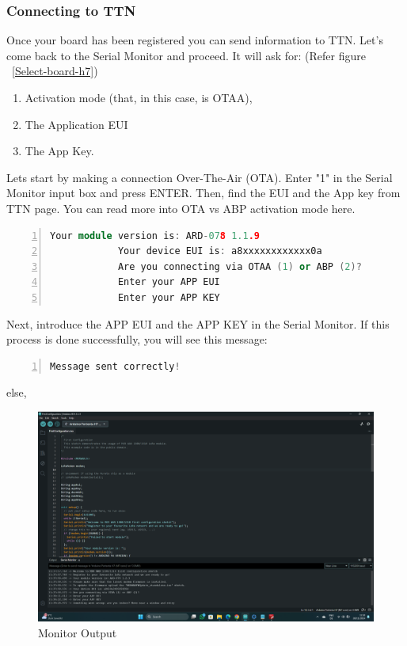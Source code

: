 \begin{itemize}
\subsubsection{Connecting to TTN} Once your board has been registered you can send information to TTN. Let's come back to the Serial Monitor and proceed. It will ask for: (Refer figure ~\ref{Select-board-h7})
		
		\begin{enumerate}
			\item Activation mode (that, in this case, is OTAA),
			\item The Application EUI
			\item The App Key.
		\end{enumerate}
		
		Lets start by making a connection Over-The-Air (OTA). Enter "1" in the Serial Monitor input box and press ENTER. Then, find the EUI and the App key from TTN  page. You can read more into OTA vs ABP activation mode here.
		
		\begin{lstlisting}[language=C++, frame=single, numbers=left, basicstyle=\ttfamily\small]
			Your module version is: ARD-078 1.1.9
			Your device EUI is: a8xxxxxxxxxxxx0a
			Are you connecting via OTAA (1) or ABP (2)?
			Enter your APP EUI
			Enter your APP KEY
		\end{lstlisting}
		
		Next, introduce the APP EUI and the APP KEY in the Serial Monitor. If this process is done successfully, you will see this message: \cite{ArduinoTTN:2024}
		
		\begin{lstlisting}[language=C++, frame=single, numbers=left, basicstyle=\ttfamily\small]
			Message sent correctly!
		\end{lstlisting}
		
		else,
		
		\begin{figure}
			\begin{center}
				\includegraphics[width=0.7\linewidth]{Images/LORA/LoraConnection.png}
				\caption{Monitor Output}
				\label{Monitor}
			\end{center}
		\end{figure}
		

\end{itemize}
